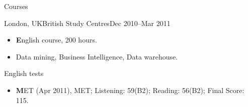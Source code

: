 \documentclass[]{mcdowellcv}
\begin{document}
	\begin{cvsection}{Courses}
		\begin{cvsubsection}{London,	UK}{British Study Centres}{Dec 2010--Mar 2011}	
			\begin{itemize}
				\item \textbf English course, 200 hours. 
				\item Data mining, Business Intelligence, Data warehouse.
			\end{itemize}
		\end{cvsubsection}
	\end{cvsection}	
	
	\begin{cvsection}{English	tests}
		\begin{cvsubsection}{}{}{}	
			\begin{itemize}
				\item \textbf MET (Apr 2011), MET; Listening: 59(B2); Reading: 56(B2); Final	Score: 115. 
			\end{itemize}
		\end{cvsubsection}
	\end{cvsection}	

	
\end{document}
